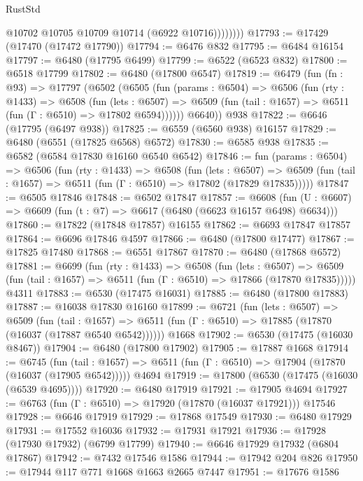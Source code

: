 \begin{lexlean}{RustStd}
\begin{coremodule}
                  @10702
                  @10705
                  @10709
                  @10714
                  (@6922 @10716))))))))
@17793 := @17429 (@17470 (@17472 @17790))
@17794 := @6476 @832
@17795 := @6484 @16154
@17797 := @6480 (@17795 @6499)
@17799 := @6522 (@6523 @832)
@17800 := @6518 @17799
@17802 := @6480 (@17800 @6547)
@17819 := @6479
    (fun (fn : @93) =>
    @17797
      (@6502
        (@6505
          (fun (params : @6504) =>
          @6506
            (fun (rty : @1433) =>
            @6508
              (fun (lets : @6507) =>
              @6509 (fun (tail : @1657) => @6511 (fun (Γ : @6510) => @17802 @6594))))))
        @6640))
    @938
@17822 := @6646 (@17795 (@6497 @938))
@17825 := @6559 (@6560 @938) @16157
@17829 := @6480 (@6551 (@17825 @6568) @6572)
@17830 := @6585 @938
@17835 := @6582 (@6584 @17830 @16160 @6540 @6542)
@17846 := fun (params : @6504) =>
  @6506
    (fun (rty : @1433) =>
    @6508
      (fun (lets : @6507) =>
      @6509 (fun (tail : @1657) => @6511 (fun (Γ : @6510) => @17802 (@17829 @17835)))))
@17847 := @6505 @17846
@17848 := @6502 @17847
@17857 := @6608
    (fun (U : @6607) => @6609 (fun (t : @7) => @6617 (@6480 (@6623 @16157 @6498) @6634)))
@17860 := @17822 (@17848 @17857) @16155
@17862 := @6693 @17847 @17857
@17864 := @6696 @17846 @4597
@17866 := @6480 (@17800 @17477)
@17867 := @17825 @17480
@17868 := @6551 @17867
@17870 := @6480 (@17868 @6572)
@17881 := @6699
    (fun (rty : @1433) =>
    @6508
      (fun (lets : @6507) =>
      @6509 (fun (tail : @1657) => @6511 (fun (Γ : @6510) => @17866 (@17870 @17835)))))
    @4311
@17883 := @6530 (@17475 @16031)
@17885 := @6480 (@17800 @17883)
@17887 := @16038 @17830 @16160
@17899 := @6721
    (fun (lets : @6507) =>
    @6509
      (fun (tail : @1657) =>
      @6511 (fun (Γ : @6510) => @17885 (@17870 (@16037 (@17887 @6540 @6542))))))
    @1668
@17902 := @6530 (@17475 (@16030 @8467))
@17904 := @6480 (@17800 @17902)
@17905 := @17887 @1668
@17914 := @6745
    (fun (tail : @1657) => @6511 (fun (Γ : @6510) => @17904 (@17870 (@16037 (@17905 @6542)))))
    @4694
@17919 := @17800 (@6530 (@17475 (@16030 (@6539 @4695))))
@17920 := @6480 @17919
@17921 := @17905 @4694
@17927 := @6763 (fun (Γ : @6510) => @17920 (@17870 (@16037 @17921))) @17546
@17928 := @6646 @17919
@17929 := @17868 @17549
@17930 := @6480 @17929
@17931 := @17552 @16036
@17932 := @17931 @17921
@17936 := @17928 (@17930 @17932) (@6799 @17799)
@17940 := @6646 @17929 @17932 (@6804 @17867)
@17942 := @7432 @17546 @1586
@17944 := @17942 @204 @826
@17950 := @17944 @117 @771 @1668 @1663 @2665 @7447
@17951 := @17676 @1586

\end{coremodule}
\end{lexlean}
